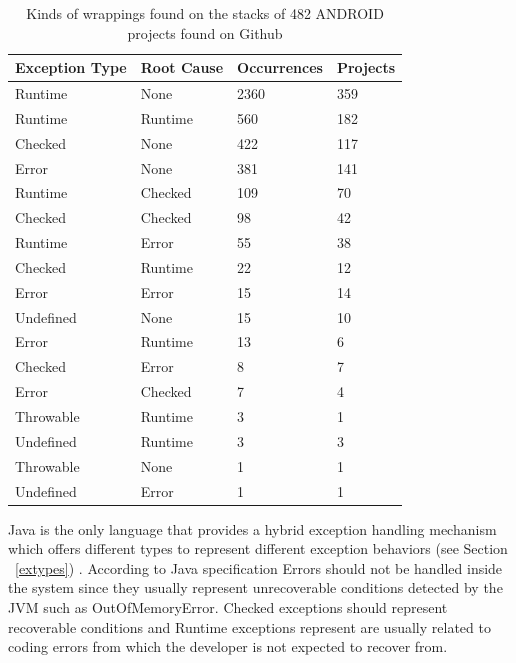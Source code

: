 \documentclass[conference]{IEEEtran}
\begin{document}
\begin{table}
\centering
\begin{tabular}{llll}
    \hline
    \bfseries{Exception Type} & \bfseries{Root Cause} & \bfseries{Occurrences} & \bfseries{Projects} \\
    \hline
    Runtime   & None    & 2360 & 359 \\
    Runtime   & Runtime & 560  & 182 \\
    Checked   & None    & 422  & 117 \\
    Error     & None    & 381  & 141 \\
    Runtime   & Checked & 109  & 70  \\
    Checked   & Checked & 98   & 42  \\
    Runtime   & Error   & 55   & 38  \\
    Checked   & Runtime & 22   & 12  \\
    Error     & Error   & 15   & 14  \\
    Undefined & None    & 15   & 10  \\
    Error     & Runtime & 13   & 6 \\
    Checked   & Error   & 8    & 7 \\
    Error     & Checked & 7    & 4 \\
    Throwable & Runtime & 3    & 1 \\
    Undefined & Runtime & 3    & 3 \\
    Throwable & None    & 1    & 1 \\
    Undefined & Error   & 1    & 1 \\
    \hline
  \end{tabular}
\caption{Kinds of wrappings found on the stacks of 482 ANDROID projects found on Github}
\label{fig:wrappingandroid}
\end{table}

Java is the only language that provides a hybrid exception handling mechanism
which offers different types to represent different exception behaviors (see
Section ~\ref{extypes}) . According to Java specification Errors should not be
handled inside the system since they usually represent unrecoverable conditions
detected by the JVM such as OutOfMemoryError. Checked exceptions should
represent recoverable conditions and  Runtime exceptions represent are usually
related to coding errors from which the developer is not expected to recover
from.

\end{document}
